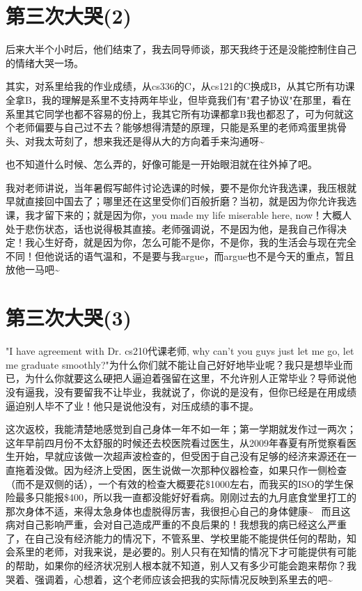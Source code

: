 \documentclass[12pt]{book}
\begin{document}
\section{第三次大哭(2)}
\label{sec-43-2}

后来大半个小时后，他们结束了，我去同导师谈，那天我终于还是没能控制住自己的情绪大哭一场。

其实，对系里给我的作业成绩，从cs336的C，从cs121的C换成B，从其它所有功课全拿B，我的理解是系里不支持两年毕业，但毕竟我们有"君子协议"在那里，看在系里其它同学也都不容易的份上，我其它所有功课都拿B我也都忍了，可为何就这个老师偏要与自己过不去？能够想得清楚的原理，只能是系里的老师鸡蛋里挑骨头、对我太苛刻了，想来我还是得从大的方向着手来沟通呀\textasciitilde{}~

也不知道什么时候、怎么弄的，好像可能是一开始眼泪就在往外掉了吧。

我对老师讲说，当年暑假写邮件讨论选课的时候，要不是你允许我选课，我压根就早就直接回中国去了；哪里还在这里受你们百般折磨？当初，就是因为你允许我选课，我才留下来的；就是因为你，you made my life miserable here, now！大概人处于悲伤状态，话也说得极其直接。老师强调说，不是因为他，是我自己作得决定！我心生好奇，就是因为你，怎么可能不是你，不是你，我的生活会与现在完全不同！但他说话的语气温和，不是要与我argue，而argue也不是今天的重点，暂且放他一马吧\textasciitilde{}~

\section{第三次大哭(3)}
\label{sec-43-3}

"I have agreement with Dr. cs210代课老师, why can't you guys just let me go, let me graduate smoothly?"为什么你们就不能让自己好好地毕业呢？我只是想毕业而已，为什么你就要这么硬把人逼迫着强留在这里，不允许别人正常毕业？导师说他没有逼我，没有要留我不让毕业，我就说了，你说的是没有，但你已经是在用成绩逼迫别人毕不了业！他只是说他没有，对压成绩的事不提。

这次返校，我能清楚地感觉到自己身体一年不如一年；第一学期就发作过一两次；这年早前四月份不太舒服的时候还去校医院看过医生，从2009年春夏有所觉察看医生开始，早就应该做一次超声波检查的，但受困于自己没有足够的经济来源还在一直拖着没做。因为经济上受困，医生说做一次那种仪器检查，如果只作一侧检查（而不是双侧的话），一个有效的检查大概要花\$1000左右，而我买的ISO的学生保险最多只能报\$400，所以我一直都没能好好看病。刚刚过去的九月底食堂里打工的那次身体不适，来得太急身体也虚脱得厉害，我很担心自己的身体健康\textasciitilde{}~ 而且这病对自己影响严重，会对自己造成严重的不良后果的！我想我的病已经这么严重了，在自己没有经济能力的情况下，不管系里、学校里能不能提供任何的帮助，知会系里的老师，对我来说，是必要的。别人只有在知情的情况下才可能提供有可能的帮助，如果你的经济状况别人根本就不知道，别人又有多少可能会跑来帮你？我哭着、强调着，心想着，这个老师应该会把我的实际情况反映到系里去的吧\textasciitilde{}~
\end{document}
